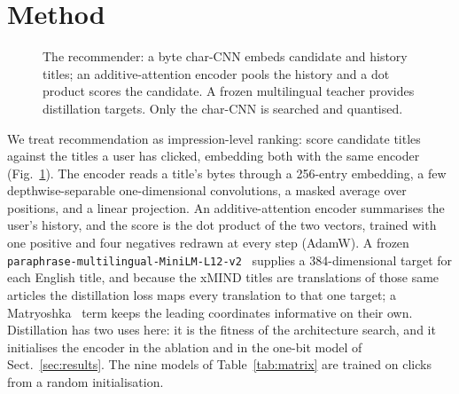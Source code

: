 \documentclass{llncs}
\begin{document}
\section{Method}
\begin{figure}[t]
\centering
{}
\caption{The recommender: a byte char-CNN embeds candidate and history titles; an
additive-attention encoder pools the history and a dot product scores the
candidate. A frozen multilingual teacher provides distillation targets. Only the
char-CNN is searched and quantised.}
\label{fig:arch}
\end{figure}
We treat recommendation as impression-level ranking: score candidate titles against the
titles a user has clicked, embedding both with the same encoder
(Fig.~\ref{fig:arch}). The encoder reads a title's bytes through a 256-entry
embedding, a few depthwise-separable one-dimensional convolutions, a masked
average over positions, and a linear projection. An additive-attention encoder
summarises the user's history, and the score is the dot product of the two
vectors, trained with one positive and four negatives redrawn at every step
(AdamW). A frozen
\texttt{paraphrase-multilingual-MiniLM-L12-v2}~\cite{wang2020minilm} supplies a
384-dimensional target for each English title, and because the xMIND titles are
translations of those same articles the distillation loss maps every translation
to that one target; a Matryoshka~\cite{kusupati2022matryoshka} term keeps the
leading coordinates informative on their own. Distillation has two uses here: it
is the fitness of the architecture search, and it initialises the encoder in the
ablation and in the one-bit model of Sect.~\ref{sec:results}. The nine models of
Table~\ref{tab:matrix} are trained on clicks from a random initialisation.
\end{document}
